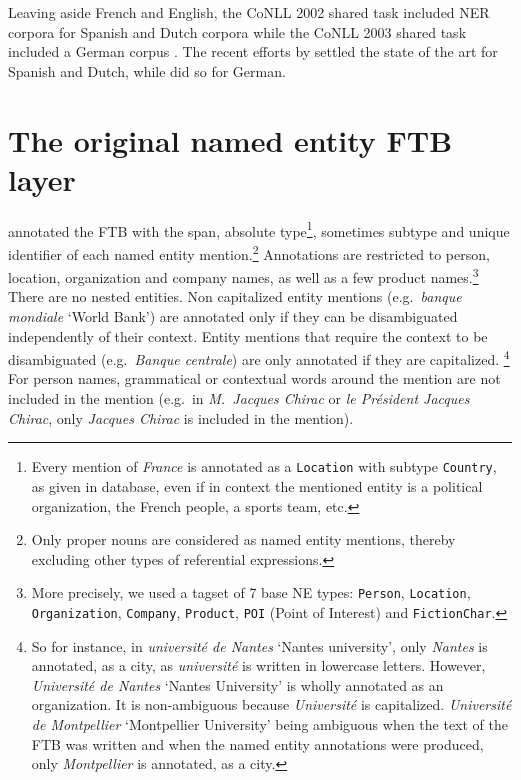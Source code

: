 Leaving aside French and English, the CoNLL 2002 shared task included NER corpora for Spanish and Dutch corpora \cite{tjong-kim-sang-2002-introduction} while the CoNLL 2003 shared task included a German corpus \cite{tjong-kim-sang-de-meulder-2003-introduction}. The recent efforts by  settled the state of the art for Spanish and Dutch, while  did so for German.



\section{The original named entity FTB layer}
\label{subsec:originalannotations}


 annotated the FTB with the span, absolute type\footnote{
    Every mention of \emph{France} is annotated as a \texttt{Location} with subtype \texttt{Country}, as given in \aleda database, even if in context the mentioned entity is a political organization, the French people, a sports team, etc.}, sometimes subtype and \aleda unique identifier of each named entity mention.\footnote{Only proper nouns are considered as named entity mentions, thereby excluding other types of referential expressions.} Annotations are restricted to person, location, organization and company names, as well as a few product names.\footnote{More precisely, we used a tagset of 7 base NE types: \texttt{Person}, \texttt{Location}, \texttt{Organization}, \texttt{Company}, \texttt{Product}, \texttt{POI} (Point of Interest) and \texttt{FictionChar}.} There are no nested entities. Non capitalized entity mentions (e.g.~\emph{banque mondiale} `World Bank') are annotated only if they can be disambiguated independently of their context. Entity mentions that require the context to be disambiguated (e.g.~\emph{Banque centrale}) are only annotated if they are capitalized.
\footnote{So for instance, in \emph{université de Nantes} `Nantes university', only \emph{Nantes} is annotated, as a city, as \emph{université} is written in lowercase letters. However, \emph{Université de Nantes} `Nantes University' is wholly annotated as an organization. It is non-ambiguous because \emph{Université} is capitalized. \emph{Université de Montpellier} `Montpellier University' being ambiguous when the text of the FTB was written and when the named entity annotations were produced, only \emph{Montpellier} is annotated, as a city.}
For person names, grammatical or contextual words around the mention are not included in the mention (e.g.~in \emph{M.~Jacques Chirac} or \emph{le Président Jacques Chirac}, only \emph{Jacques Chirac} is included in the mention).


